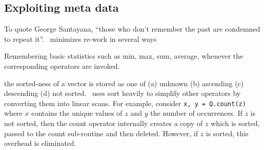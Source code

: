 \subsection{Exploiting meta data}

To quote George Santayana, ``those who don't remember the past are condemned to
repeat it''.  \Q\ minimizes re-work in several ways
\be
\item 
Remembering basic statistics such as min, max, sum, average, whenever the
corresponding operators are invoked. 
\item the sorted-ness of a vector is
stored as one of (a) unknown (b) ascending (c) descending (d) not sorted. \Q\
uses sort heavily to simplify other operators by converting them into linear
scans. For example, consider {\tt x, y  = Q.count(z)} where \(x\) contains the
unique values of \(z\) and \(y\) the number of occurrences. If \(z\) is not
sorted, then the count operator internally creates a copy of \(z\) which is
sorted, passed to the count sub-routine and then deleted. However, if \(z\) is
sorted, this overhead is eliminated.

\ee

